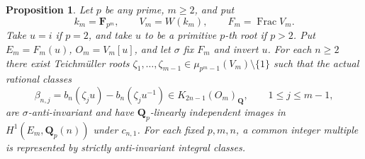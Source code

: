 \documentclass[11pt,a4paper]{amsart}
\numberwithin{equation}{section}
\newtheorem{proposition}[theorem]{Proposition}
\theoremstyle{definition}
\theoremstyle{remark}
\newcommand{\Q}{\mathbf Q}
\newcommand{\F}{\mathbf F}
\newcommand{\Frac}{\operatorname{Frac}}
\begin{document}
\begin{proposition}
\label{d3:prop:unramifiedhighercoefficients}
Let $p$ be any prime, $m\geq2$, and put
\[
 k_m=\F_{p^m},\qquad V_m=W(k_m),\qquad F_m=\Frac V_m.
\]
Take $u=i$ if $p=2$, and take $u$ to be a primitive $p$-th root
if $p>2$. Put $E_m=F_m(u)$, $O_m=V_m[u]$, and let $\sigma$
fix $F_m$ and invert $u$.
For each $n\geq2$ there exist Teichm\"uller roots
$\zeta_1,\ldots,\zeta_{m-1}\in\mu_{p^m-1}(V_m)\setminus\{1\}$
such that the actual rational classes
\[
 \beta_{n,j}=b_n(\zeta_ju)-b_n(\zeta_ju^{-1})
 \in K_{2n-1}(O_m)_{\Q},\qquad 1\leq j\leq m-1,
\]
are $\sigma$-anti-invariant and have $\Q_p$-linearly independent
images in $H^1(E_m,\Q_p(n))$ under $c_{n,1}$.
For each fixed $p,m,n$, a common integer multiple is represented
by strictly anti-invariant integral classes.
\end{proposition}
\end{document}
